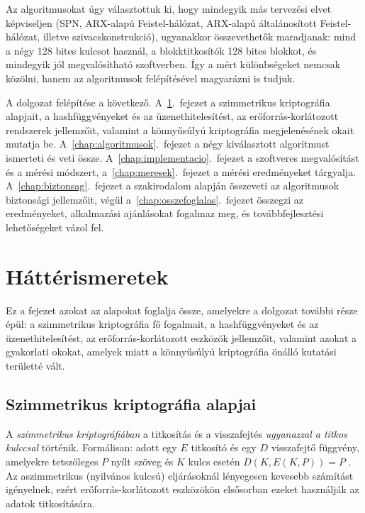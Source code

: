 \documentclass[a4paper,12pt]{report}
\theoremstyle{definition}
\theoremstyle{remark}
\begin{document}
Az algoritmusokat úgy választottuk ki, hogy mindegyik más tervezési elvet képviseljen (SPN, ARX-alapú Feistel-hálózat, ARX-alapú általánosított Feistel-hálózat, illetve szivacskonstrukció), ugyanakkor összevethetők maradjanak: mind a négy 128 bites kulcsot használ, a blokktitkosítók 128 bites blokkot, és mindegyik jól megvalósítható szoftverben. Így a mért különbségeket nemcsak közölni, hanem az algoritmusok felépítésével magyarázni is tudjuk.

A dolgozat felépítése a következő. A~\ref{chap:hatter}.~fejezet a szimmetrikus kriptográfia alapjait, a hashfüggvényeket és az üzenethitelesítést, az erőforrás-korlátozott rendszerek jellemzőit, valamint a könnyűsúlyú kriptográfia megjelenésének okait mutatja be. A~\ref{chap:algoritmusok}.~fejezet a négy kiválasztott algoritmust ismerteti és veti össze. A~\ref{chap:implementacio}.~fejezet a szoftveres megvalósítást és a mérési módszert, a~\ref{chap:meresek}.~fejezet a mérési eredményeket tárgyalja. A~\ref{chap:biztonsag}.~fejezet a szakirodalom alapján összeveti az algoritmusok biztonsági jellemzőit, végül a~\ref{chap:osszefoglalas}.~fejezet összegzi az eredményeket, alkalmazási ajánlásokat fogalmaz meg, és továbbfejlesztési lehetőségeket vázol fel.

\chapter{Háttérismeretek}\label{chap:hatter}

Ez a fejezet azokat az alapokat foglalja össze, amelyekre a dolgozat további része épül: a szimmetrikus kriptográfia fő fogalmait, a hashfüggvényeket és az üzenethitelesítést, az erőforrás-korlátozott eszközök jellemzőit, valamint azokat a gyakorlati okokat, amelyek miatt a könnyűsúlyú kriptográfia önálló kutatási területté vált.

\section{Szimmetrikus kriptográfia alapjai}\label{sec:szimmetrikus}

A \emph{szimmetrikus kriptográfiában} a titkosítás és a visszafejtés \emph{ugyanazzal a titkos kulccsal} történik. Formálisan: adott egy $E$ titkosító és egy $D$ visszafejtő függvény, amelyekre tetszőleges $P$ nyílt szöveg és $K$ kulcs esetén $D(K, E(K, P)) = P$ \cite{Stallings2017}. Az aszimmetrikus (nyilvános kulcsú) eljárásoknál lényegesen kevesebb számítást igényelnek, ezért erőforrás-korlátozott eszközökön elsősorban ezeket használják az adatok titkosítására.
\end{document}
